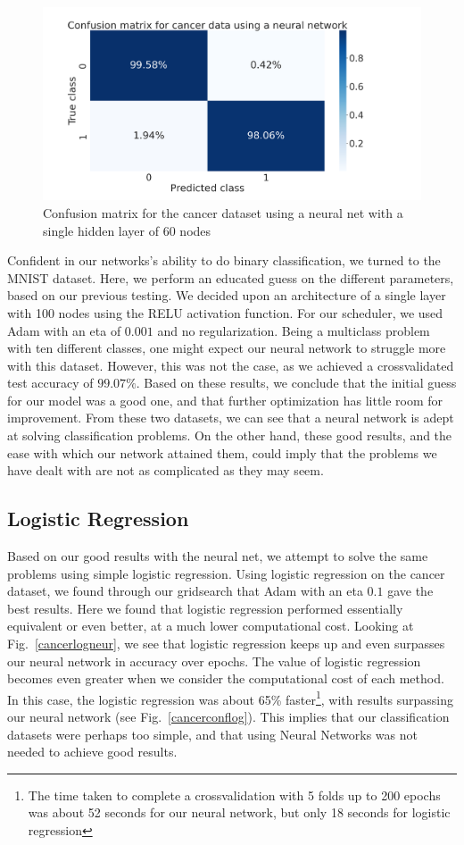 \documentclass[onecolumn,10pt,cleanfoot]{asme2ej}
\begin{document}
\begin{figure}[h]
\centerline{\includegraphics[width=5in]{figure/cancerconf.png}}
\caption{Confusion matrix for the cancer dataset using a neural net with a single hidden layer of 60 nodes}
\label{cancerconf}
\end{figure}

Confident in our networks's ability to do binary classification, we turned to the MNIST dataset. Here, we perform an educated guess on the different parameters, based on our previous testing. We decided upon an architecture of a single layer with 100 nodes using the RELU activation function. For our scheduler, we used Adam with an eta of $0.001$ and no regularization. Being a multiclass problem with ten different classes, one might expect our neural network to struggle more with this dataset. However, this was not the case, as we achieved a crossvalidated test accuracy of $99.07\%$. Based on these results, we conclude that the initial guess for our model was a good one, and that further optimization has little room for improvement. From these two datasets, we can see that a neural network is adept at solving classification problems. On the other hand, these good results, and the ease with which our network attained them, could imply that the problems we have dealt with are not as complicated as they may seem.

\subsection{Logistic Regression}

Based on our good results with the neural net, we attempt to solve the same problems using simple logistic regression. Using logistic regression on the cancer dataset, we found through our gridsearch that Adam with an eta $0.1$ gave the best results. Here we found that logistic regression performed essentially equivalent or even better, at a much lower computational cost. Looking at Fig.~\ref{cancerlogneur}, we see that logistic regression keeps up and even surpasses our neural network in accuracy over epochs. The value of logistic regression becomes even greater when we consider the computational cost of each method. In this case, the logistic regression was about 65\% faster\footnote{The time taken to complete a crossvalidation with 5 folds up to 200 epochs was about 52 seconds for our neural network, but only 18 seconds for logistic regression}, with results surpassing our neural network (see Fig.~\ref{cancerconflog}). This implies that our classification datasets were perhaps too simple, and that using Neural Networks was not needed to achieve good results.
\end{document}
